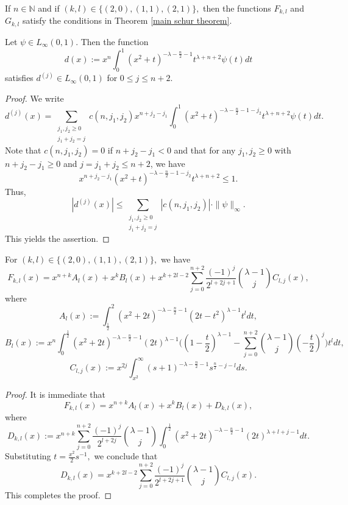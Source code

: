\documentclass{amsart}
\begin{document}
\begin{theorem}\label{fkl are smooth theorem} If $n\in\mathbb{N}$ and if $(k,l)\in\{(2,0),(1,1),(2,1)\},$ then the functions $F_{k,l}$ and $G_{k,l}$ satisfy the conditions in Theorem \ref{main schur theorem}.
\end{theorem}

\begin{lemma}\label{first fkl lemma} Let $\psi\in L_{\infty}(0,1).$ Then the function
$$d(x):=x^n\int_0^1(x^2+t)^{-\lambda-\frac{n}{2}-1}t^{\lambda+n+2}\psi(t)dt$$
satisfies $d^{(j)}\in L_{\infty}(0,1)$ for $0\leq j\leq n+2.$
\end{lemma}
\begin{proof} We write
$$d^{(j)}(x)=\sum_{\substack{j_1,j_2\geq0\\ j_1+j_2=j}}c(n,j_1,j_2)x^{n+j_2-j_1}\int_0^1(x^2+t)^{-\lambda-\frac{n}{2}-1-j_2}t^{\lambda+n+2}\psi(t)dt.$$
Note that $c(n,j_1,j_2)=0$ if $n+j_2-j_1<0$ and that for any $j_1,j_2\geq0$ with $n+j_2-j_1\geq 0$ and $j=j_1+j_2\leq n+2$, we have
$$x^{n+j_2-j_1}(x^2+t)^{-\lambda-\frac{n}{2}-1-j_2}t^{\lambda+n+2}\leq 1.$$
Thus,
$$|d^{(j)}(x)|\leq \sum_{\substack{j_1,j_2\geq0\\ j_1+j_2=j}}|c(n,j_1,j_2)|\cdot \|\psi\|_{\infty}.$$
This yields the assertion.
\end{proof}

\begin{lemma}\label{second fkl lemma} For $(k,l)\in\{(2,0),(1,1),(2,1)\},$ we have
$$F_{k,l}(x)=x^{n+k}A_l(x)+x^kB_l(x)+x^{k+2l-2}\sum_{j=0}^{n+2}\frac{(-1)^j}{2^{l+2j+1}}\binom{\lambda-1}{j}C_{l,j}(x),$$
where
$$A_l(x):=\int_{\frac12}^2(x^2+2t)^{-\lambda-\frac{n}{2}-1}(2t-t^2)^{\lambda-1}t^ldt,$$
$$B_l(x):=x^n\int_0^{\frac12}(x^2+2t)^{-\lambda-\frac{n}{2}-1}(2t)^{\lambda-1}\Big((1-\frac{t}{2})^{\lambda-1}-\sum_{j=0}^{n+2}\binom{\lambda-1}{j}(-\frac{t}{2})^j\Big)t^ldt,$$
$$C_{l,j}(x):=x^{2j}\int_{x^2}^{\infty}(s+1)^{-\lambda-\frac{n}{2}-1}s^{\frac{n}{2}-j-l}ds.$$
\end{lemma}
\begin{proof} It is immediate that
$$F_{k,l}(x)=x^{n+k}A_l(x)+x^kB_l(x)+D_{k,l}(x),$$
where
$$D_{k,l}(x):=x^{n+k}\sum_{j=0}^{n+2}\frac{(-1)^j}{2^{l+2j}}\binom{\lambda-1}{j}\int_0^{\frac12}(x^2+2t)^{-\lambda-\frac{n}{2}-1}(2t)^{\lambda+l+j-1}dt.$$
Substituting $t=\frac{x^2}{2}s^{-1},$ we conclude that
$$D_{k,l}(x)=x^{k+2l-2}\sum_{j=0}^{n+2}\frac{(-1)^j}{2^{l+2j+1}}\binom{\lambda-1}{j}C_{l,j}(x).$$
This completes the proof.
\end{proof}
\end{document}
